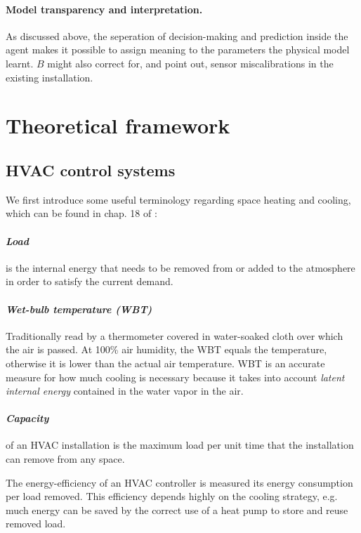 \documentclass{article}
\theoremstyle{definition}
\theoremstyle{remark}
\begin{document}
\paragraph{Model transparency and interpretation.}
As discussed above, the seperation of decision-making and prediction inside the agent makes it possible to assign meaning to the parameters the physical model learnt. $B$ might also correct for, and point out, sensor miscalibrations \cite{luo2022controlling} in the existing installation.

\section{Theoretical framework}

\subsection{HVAC control systems}\label{theory:HVAC}
We first introduce some useful terminology regarding space heating and cooling, which can be found in chap. 18 of \cite{ashraeHandbook}:

\paragraph{\textit{Load}} is the internal energy that needs to be removed from or added to the atmosphere in order to satisfy the current demand.

\paragraph{\textit{Wet-bulb temperature (WBT)}} Traditionally read by a thermometer covered in water-soaked cloth over which the air is passed. At 100\% air humidity, the WBT equals the temperature, otherwise it is lower than the actual air temperature. WBT is an accurate measure for how much cooling is necessary because it takes into account \textit{latent internal energy} contained in the water vapor in the air.

\paragraph{\textit{Capacity}} of an HVAC installation is the maximum load per unit time that the installation can remove from any space.

The energy-efficiency of an HVAC controller is measured its energy consumption per load removed. This efficiency depends highly on the cooling strategy, e.g. much energy can be saved by the correct use of a heat pump to store and reuse removed load.
\end{document}
